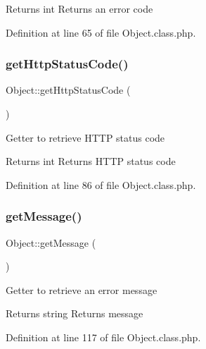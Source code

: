 \begin{DoxyReturn}{Returns}
int Returns an error code 
\end{DoxyReturn}


Definition at line 65 of file Object.\+class.\+php.

\mbox{\label{classObject_a5cb4abc24dd01e04c24da487d476efc0}} 
\subsubsection{\texorpdfstring{get\+Http\+Status\+Code()}{getHttpStatusCode()}}
{\footnotesize\ttfamily Object\+::get\+Http\+Status\+Code (\begin{DoxyParamCaption}{ }\end{DoxyParamCaption})}

Getter to retrieve H\+T\+TP status code

\begin{DoxyReturn}{Returns}
int Returns H\+T\+TP status code 
\end{DoxyReturn}


Definition at line 86 of file Object.\+class.\+php.

\mbox{\label{classObject_a813487b153bfe18102ac76d8c718999f}} 
\subsubsection{\texorpdfstring{get\+Message()}{getMessage()}}
{\footnotesize\ttfamily Object\+::get\+Message (\begin{DoxyParamCaption}{ }\end{DoxyParamCaption})}

Getter to retrieve an error message

\begin{DoxyReturn}{Returns}
string Returns message 
\end{DoxyReturn}


Definition at line 117 of file Object.\+class.\+php.

\mbox{\label{classObject_afe1fe6fc005389cd616a5e9105de977a}} 
